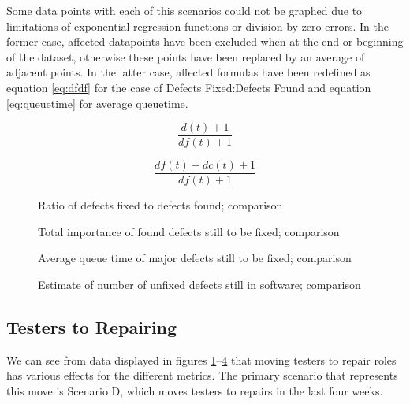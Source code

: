 \documentclass[a4paper,10pt]{article}
\begin{document}
Some data points with each of this scenarios could not be graphed due to limitations of exponential regression functions or division by zero errors. In the former case, affected datapoints have been excluded when at the end or beginning of the dataset, otherwise these points have been replaced by an average of adjacent points. In the latter case, affected formulas have been redefined as equation \ref{eq:dfdf} for the case of Defects Fixed:Defects Found and equation \ref{eq:queuetime} for average queuetime.

\begin{equation} \label{eq:dfdf}
\frac{d(t)+1}{\mathit{df}(t)+1}
\end{equation}

\begin{equation} \label{eq:queuetime}
\frac{\mathit{df}(t) + \mathit{dc}(t) + 1}{\mathit{df}(t) + 1}
\end{equation}

\begin{figure}
  \centering
  
  \caption{Ratio of defects fixed to defects found; comparison}
  \label{comp:dfdf}
\end{figure}

\begin{figure}
  \centering
  
  \caption{Total importance of found defects still to be fixed; comparison}
  \label{comp:tifd}
\end{figure}

\begin{figure}
  \centering
  
  \caption{Average queue time of major defects still to be fixed; comparison}
  \label{comp:queuetime}
\end{figure}

\begin{figure}
  \centering
  
  \caption{Estimate of number of unfixed defects still in software; comparison}
  \label{comp:remainingbugs}
\end{figure}

\subsection{Testers to Repairing}
We can see from data displayed in figures \ref{comp:dfdf}--\ref{comp:remainingbugs} that moving testers to repair roles has various effects for the different metrics. The primary scenario that represents this move is Scenario D, which moves testers to repairs in the last four weeks.
\end{document}
